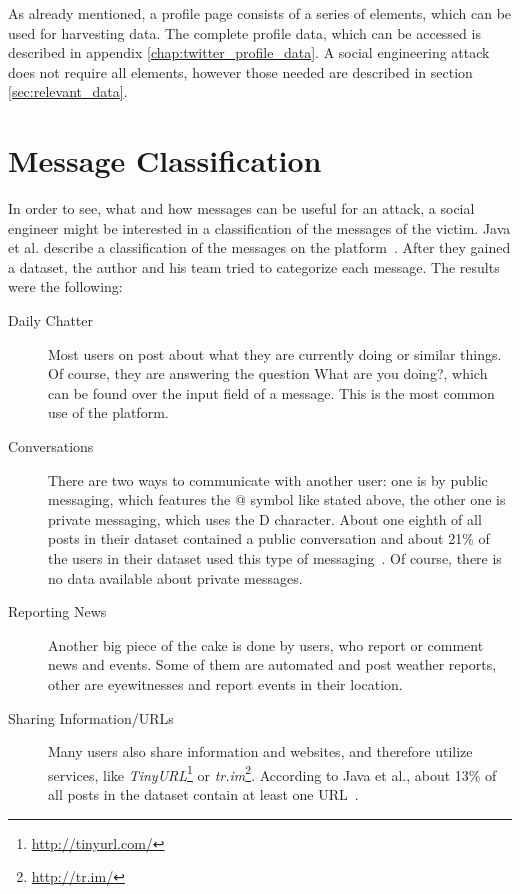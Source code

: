 As already mentioned, a \Twitter{} profile page consists of a series of
elements, which can be used for harvesting data. The complete profile data,
which can be accessed is described in appendix \ref{chap:twitter_profile_data}.
A social engineering attack does not require all elements, however those needed
are described in section \ref{sec:relevant_data}.

\section{Message Classification}

In order to see, what and how messages can be useful for an attack, a social
engineer might be interested in a classification of the messages of the victim.
Java et al. describe a classification of the messages on the \Twitter{}
platform~\cite{java2007}. After they gained a dataset, the author and his team
tried to categorize each message. The results were the following:

\begin{description}

\item[Daily Chatter]
Most users on \Twitter{} post about what they are currently doing or similar
things. Of course, they are answering the question \glqq{}What are you
doing?\grqq{}, which can be found over the input field of a message. This is
the most common use of the \Twitter{} platform.

\item[Conversations]
There are two ways to communicate with another user: one is by public
messaging, which features the @ symbol like stated above, the other one is
private messaging, which uses the D character. About one eighth of all posts
in their dataset contained a public conversation and about 21\% of the users in
their dataset used this type of messaging~\cite{java2007}. Of course, there is
no data available about private messages.

\item[Reporting News]
Another big piece of the cake is done by users, who report or comment news and
events. Some of them are automated and post weather reports, other are
eyewitnesses and report events in their location.

\item[Sharing Information/URLs]
Many users also share information and websites, and therefore utilize services,
like \textit{TinyURL}\footnote{\url{http://tinyurl.com/}} or
\textit{tr.im}\footnote{\url{http://tr.im/}}. According to Java et al.,
about 13\% of all posts in the dataset contain at least one URL~\cite{java2007}.

\end{description}


